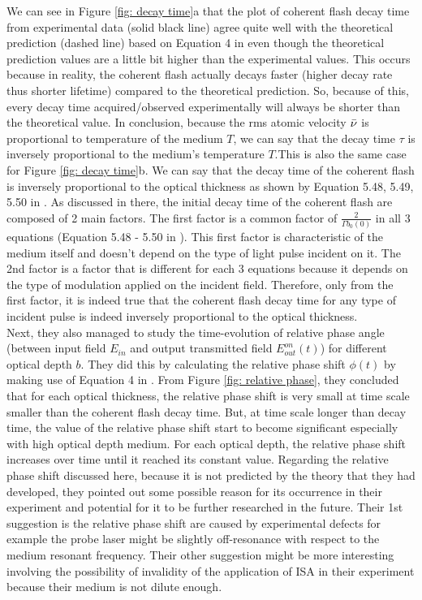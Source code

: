 We can see in Figure \ref{fig: decay time}a that the plot of coherent flash decay time from experimental data (solid black line) agree quite well with the theoretical prediction (dashed line) based on Equation 4 in \cite{Chalony2011} even though the theoretical prediction values are a little bit higher than the experimental values. This occurs because in reality, the coherent flash actually decays faster (higher decay rate thus shorter lifetime) compared to the theoretical prediction. So, because of this, every decay time acquired/observed experimentally will always be shorter than the theoretical value. In conclusion, because the rms atomic velocity $\Bar{\nu}$ is proportional to temperature of the medium $T$, we can say that the decay time $\tau$ is inversely proportional to the medium's temperature $T$.This is also the same case for Figure \ref{fig: decay time}b. We can say that the decay time of the coherent flash is inversely proportional to the optical thickness as shown by Equation 5.48, 5.49, 5.50 in \cite{Kwong2017}. As discussed in there, the initial decay time of the coherent flash are composed of 2 main factors. The first factor is a common factor of $\frac{2}{\Gamma b_{0}(0)}$ in all 3 equations (Equation 5.48 - 5.50 in \cite{Kwong2017}). This first factor is characteristic of the medium itself and doesn't depend on the type of light pulse incident on it. The 2nd factor is a factor that is different for each 3 equations because it depends on the type of modulation applied on the incident field. Therefore, only from the first factor, it is indeed true that the coherent flash decay time for any type of incident pulse is indeed inversely proportional to the optical thickness.\\

Next, they also managed to study the time-evolution of relative phase angle (between input field $E_{in}$ and output transmitted field $E_{out}^{on}(t)$) for different optical depth $b$. They did this by calculating the relative phase shift $\phi(t)$ by making use of Equation 4 in \cite{Chalony2011}. From Figure \ref{fig: relative phase}, they concluded that for each optical thickness, the relative phase shift is very small at time scale smaller than the coherent flash decay time. But, at time scale longer than decay time, the value of the relative phase shift start to become significant especially with high optical depth medium. For each optical depth, the relative phase shift increases over time until it reached its constant value. Regarding the relative phase shift discussed here, because it is not predicted by the theory that they had developed, they pointed out some possible reason for its occurrence in their experiment and potential for it to be further researched in the future. Their 1st suggestion is the relative phase shift are caused by experimental defects for example the probe laser might be slightly off-resonance with respect to the medium resonant frequency. Their other suggestion might be more interesting involving the possibility of invalidity of the application of ISA in their experiment because their medium is not dilute enough.\\

